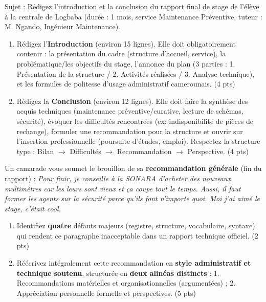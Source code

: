 \documentclass[11pt]{article}
\begin{document}
\begin{exercice}
Sujet : \og Rédigez l'introduction et la conclusion du rapport final de stage de l'élève à la centrale de Logbaba (durée : 1 mois, service Maintenance Préventive, tuteur : M. Ngando, Ingénieur Maintenance). \fg

\begin{enumerate}
    \item Rédigez l'\textbf{Introduction} (environ 15 lignes). Elle doit obligatoirement contenir : la présentation du cadre (structure d'accueil, service), la problématique/les objectifs du stage, l'annonce du plan (3 parties : 1. Présentation de la structure / 2. Activités réalisées / 3. Analyse technique), et les formules de politesse d'usage administratif camerounais. (4 pts)
    \item Rédigez la \textbf{Conclusion} (environ 12 lignes). Elle doit faire la synthèse des acquis techniques (maintenance préventive/curative, lecture de schémas, sécurité), évoquer les difficultés rencontrées (ex: indisponibilité de pièces de rechange), formuler une recommandation pour la structure et ouvrir sur l'insertion professionnelle (poursuite d'études, emploi). Respectez la structure type : Bilan $\rightarrow$ Difficultés $\rightarrow$ Recommandation $\rightarrow$ Perspective. (4 pts)
\end{enumerate}
\end{exercice}

\begin{exercice}
Un camarade vous soumet le brouillon de sa \textbf{recommandation générale} (fin du rapport) : 
\og \textit{Pour finir, je conseille à la SONARA d'acheter des nouveaux multimètres car les leurs sont vieux et ça coupe tout le temps. Aussi, il faut former les agents sur la sécurité parce qu'ils font n'importe quoi. Moi j'ai aimé le stage, c'était cool.} \fg

\begin{enumerate}
    \item Identifiez \textbf{quatre} défauts majeurs (registre, structure, vocabulaire, syntaxe) qui rendent ce paragraphe inacceptable dans un rapport technique officiel. (2 pts)
    \item Réécrivez intégralement cette recommandation en \textbf{style administratif et technique soutenu}, structurée en \textbf{deux alinéas distincts} : 1. Recommandations matérielles et organisationnelles (argumentées) ; 2. Appréciation personnelle formelle et perspectives. (5 pts)
\end{enumerate}
\end{exercice}
\end{document}
